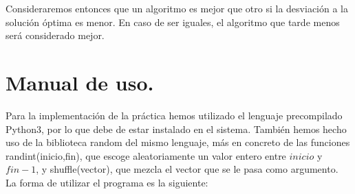 Consideraremos entonces que un algoritmo es mejor que otro si la desviación a la solución óptima es menor. En caso de ser iguales, el algoritmo que tarde menos será considerado mejor.

\newpage

\section{Manual de uso.}

Para la implementación de la práctica hemos utilizado el lenguaje precompilado Python3, por lo que debe de estar instalado en el sistema. También hemos hecho uso de la biblioteca random del mismo lenguaje, más en concreto de las funciones randint(inicio,fin), que escoge aleatoriamente un valor entero entre  $inicio$ y $fin-1$, y shuffle(vector), que mezcla el vector que se le pasa como argumento.\\

La forma de utilizar el programa es la siguiente:\\

